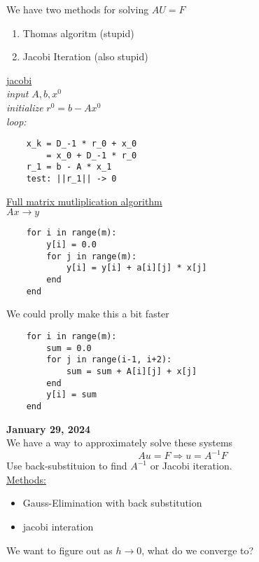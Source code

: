 \documentclass[10pt]{article}
\begin{document}
We have two methods for solving $AU = F$
\begin{enumerate}
    \item Thomas algoritm (stupid)
    \item Jacobi Iteration (also stupid)
\end{enumerate}


\underline{jacobi}\\
\textit{input}  $A, b, x^0$\\
\textit{initialize}  $r^0 = b - Ax^0$\\
\textit{loop:}
\begin{verbatim}
    x_k = D_-1 * r_0 + x_0
        = x_0 + D_-1 * r_0
    r_1 = b - A * x_1
    test: ||r_1|| -> 0
\end{verbatim}
\newpage
\underline{Full matrix mutliplication algorithm}\\
$Ax \rightarrow y$
\begin{verbatim}
    for i in range(m):
        y[i] = 0.0
        for j in range(m):
            y[i] = y[i] + a[i][j] * x[j]
        end
    end
\end{verbatim}
We could prolly make this a bit faster
\begin{verbatim}
    for i in range(m):
        sum = 0.0
        for j in range(i-1, i+2):
            sum = sum + A[i][j] + x[j]
        end
        y[i] = sum
    end
\end{verbatim}

\textbf{January 29, 2024}\\

We have a way to approximately solve these systems
\[Au = F \Rightarrow u = A^{-1}F\]
Use back-substituion to find $A^{-1}$ or Jacobi iteration.\\

\underline{Methods:}
\begin{itemize}
    \item Gauss-Elimination with back substitution
    \item jacobi interation
\end{itemize}

We want to figure out as $h \to 0$, what do we converge to?\\
\end{document}
